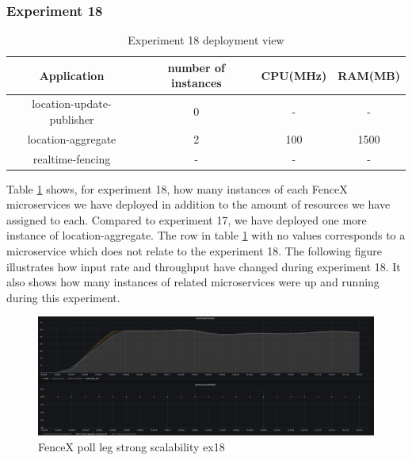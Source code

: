 \documentclass[a4]{report}
\begin{document}
    \subsubsection{Experiment 18}
    \begin{table}[h!]
        \centering
        \begin{tabular}{|c|c|c|c|}
            \hline
            Application               & number of instances & CPU(MHz) & RAM(MB) \\
            \hline
            location-update-publisher & 0                   & -        & -       \\
            location-aggregate        & 2                   & 100      & 1500    \\
            realtime-fencing          & -                   & -        & -       \\
            \hline
        \end{tabular}
        \caption{Experiment 18 deployment view}
        \label{table:ex18-dv}
    \end{table}

    Table \ref{table:ex18-dv} shows, for experiment 18, how many instances of each FenceX microservices we have
    deployed in addition to the amount of resources we have assigned to each.
    Compared to experiment 17, we have deployed one more instance of location-aggregate.
    The row in table \ref{table:ex18-dv} with no values corresponds to a microservice which does not relate to the
    experiment 18.
    The following figure illustrates how input rate and throughput have changed during experiment 18.
    It also shows how many instances of related microservices were up and running during this experiment.

    \begin{figure}[h!]
        \centering
        \caption{FenceX poll leg strong scalability ex18}
        \label{fig:ex18}
        \includegraphics[width=\linewidth, scale=2]{images/evaluation/ex18-benchmarking-ongoing-2per4sec.png}
    \end{figure}
\end{document}
